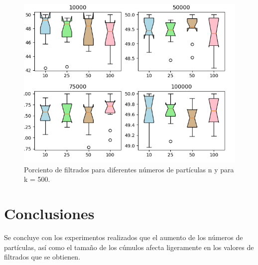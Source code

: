 \documentclass{article}
\begin{document}
\begin{figure}
\centering
	\includegraphics[width=\linewidth]{t8fig500.png}
	\caption{Porciento de filtrados para diferentes números de partículas n y para k = 500.}
	\label{1}		
\end{figure}
\section{Conclusiones}
Se concluye con los experimentos realizados que el aumento de los números de partículas, así como el tamaño de los cúmulos afecta ligeramente en los valores de filtrados que se obtienen. 



\end{document}
